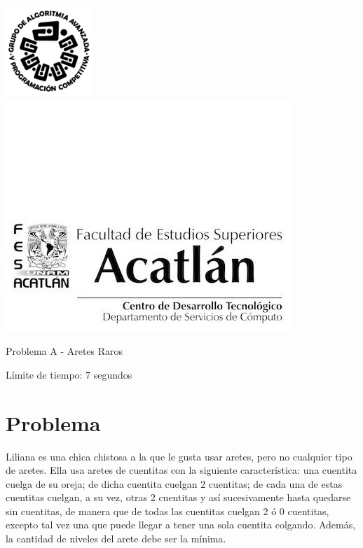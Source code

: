 \includegraphics[scale=0.6]{logo} \hspace*{9.00cm}
\includegraphics[scale=0.5]{dsc} 
\bigskip
\begin{center}
	\Large Problema A - Aretes Raros
\end{center}

\begin{flushright}
Límite de tiempo: 7 segundos
\par\end{flushright}

\section*{Problema}
Liliana es una chica chistosa a la que le gusta usar aretes, pero 
no cualquier tipo de aretes. Ella usa aretes de cuentitas con la siguiente característica: una cuentita cuelga de su oreja; de dicha cuentita cuelgan 
2 cuentitas; de cada una de estas cuentitas 
cuelgan, a su vez, otras 2 cuentitas y así sucesivamente hasta quedarse sin cuentitas,
de manera que de todas las cuentitas cuelgan 2 ó 0 cuentitas, excepto tal vez
una que puede llegar a tener una sola cuentita colgando. Además, la cantidad de niveles del arete debe ser la mínima.

